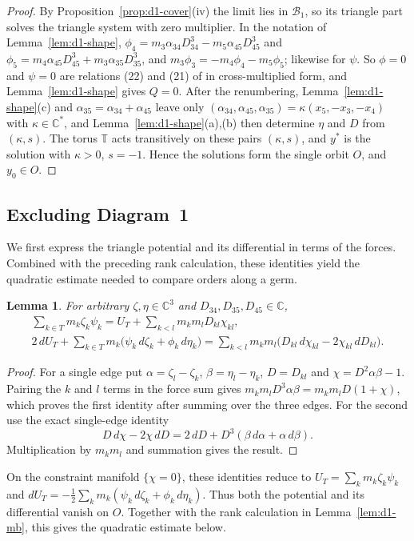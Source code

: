 \documentclass[Threeside,11pt]{article}
\newtheorem{lemma}[theorem]{Lemma}
\theoremstyle{definition}
\theoremstyle{remark}
\numberwithin{equation}{section}
\newcommand{\C}{\mathbb C}\newcommand{\T}{\mathbb T}
\theoremstyle{remark}
\begin{document}
\begin{proof}
By Proposition~\ref{prop:d1-cover}(iv) the limit lies in $\mathcal B_1$, so its triangle part
solves the triangle system with zero multiplier.  In the notation of Lemma~\ref{lem:d1-shape},
$\phi_4=m_3\alpha_{34}D_{34}^3-m_5\alpha_{45}D_{45}^3$ and
$\phi_5=m_4\alpha_{45}D_{45}^3+m_3\alpha_{35}D_{35}^3$, and $m_3\phi_3=-m_4\phi_4-m_5\phi_5$;
likewise for $\psi$.  So $\phi=0$ and $\psi=0$ are relations (22) and (21) of \cite[\S8.1]{AK} in
cross-multiplied form, and Lemma~\ref{lem:d1-shape} gives $Q=0$.
After the renumbering, Lemma~\ref{lem:d1-shape}(c) and $\alpha_{35}=\alpha_{34}+\alpha_{45}$
leave only $(\alpha_{34},\alpha_{45},\alpha_{35})=\kappa(x_5,-x_3,-x_4)$ with $\kappa\in\C^*$, and
Lemma~\ref{lem:d1-shape}(a),(b) then determine $\eta$ and $D$ from $(\kappa,s)$.  The torus
$\mathbb T$ acts transitively on these pairs $(\kappa,s)$, and $y^*$ is the solution with
$\kappa>0$, $s=-1$.  Hence the solutions form the single orbit $O$, and $y_0\in O$.
\end{proof}

\subsection{Excluding Diagram~1}

We first express the triangle potential and its differential in terms of the forces.
Combined with the preceding rank calculation, these identities yield the quadratic
estimate needed to compare orders along a germ.

{\begin{lemma}\label{lem:d1-virial}
For arbitrary $\zeta,\eta\in\C^3$ and $D_{34},D_{35},D_{45}\in\C$,
\begin{gather*}
  \sum_{k\in T}m_k\zeta_k\psi_k=U_T+\sum_{k<l}m_km_lD_{kl}\chi_{kl},\\
  2\,dU_T+\sum_{k\in T}m_k\big(\psi_k\,d\zeta_k+\phi_k\,d\eta_k\big)
  =\sum_{k<l}m_km_l\big(D_{kl}\,d\chi_{kl}-2\chi_{kl}\,dD_{kl}\big).
\end{gather*}
\end{lemma}}
{\begin{proof}
For a single edge put $\alpha=\zeta_l-\zeta_k$,
$\beta=\eta_l-\eta_k$, $D=D_{kl}$ and $\chi=D^2\alpha\beta-1$.
Pairing the $k$ and $l$ terms in the force sum gives
$m_km_lD^3\alpha\beta=m_km_lD(1+\chi)$, which proves the first identity
after summing over the three edges.  For the second use the exact
single-edge identity
\[
 D\,d\chi-2\chi\,dD
       =2\,dD+D^3(\beta\,d\alpha+\alpha\,d\beta).
\]
Multiplication by $m_km_l$ and summation gives the result.
\end{proof}

}{On the constraint manifold $\{\chi=0\}$, these identities reduce to
$U_T=\sum_km_k\zeta_k\psi_k$ and
$dU_T=-\frac12\sum_km_k(\psi_k\,d\zeta_k+\phi_k\,d\eta_k)$.
Thus both the potential and its differential vanish on $O$.  Together with the rank
calculation in Lemma~\ref{lem:d1-mb}, this gives the quadratic estimate below.}
\end{document}

